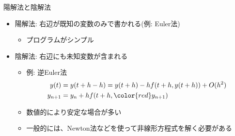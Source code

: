 \begin{frame}[t,fragile]{陽解法と陰解法}
  \begin{itemize}
  \item 陽解法: 右辺が既知の変数のみで書かれる(例: Euler法)
    \begin{itemize}
    \item プログラムがシンプル
    \end{itemize}
  \item 陰解法: 右辺にも未知変数が含まれる
    \begin{itemize}
    \item 例: 逆Euler法
      \begin{align*}
        y(t) &= y(t+h-h) = y(t+h) - h f(t+h,y(t+h)) + O(h^2) \\
        y_{n+1} &= y_n + h f(t+h,{\color{red}y_{n+1}})
      \end{align*}
    \item 数値的により安定な場合が多い
    \item 一般的には、Newton法などを使って非線形方程式を解く必要がある
    \end{itemize}
  \end{itemize}
\end{frame}
